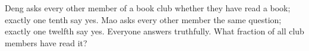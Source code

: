 Deng asks every other member of a book club whether they have read a book; exactly one tenth say yes. Mao asks every other member the same question; exactly one twelfth say yes. Everyone answers truthfully. What fraction of all club members have read it?
